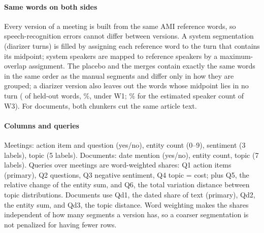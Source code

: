 \documentclass[conference]{IEEEtran}
\begin{document}
\paragraph*{Same words on both sides} Every version of a meeting is built from the same AMI reference words, so
speech-recognition errors cannot differ between versions. A system segmentation (diarizer turns) is filled by
assigning each reference word to the turn that contains its midpoint; system speakers are mapped to reference
speakers by a maximum-overlap assignment. The placebo and the merges contain exactly the same words in the same order
as the manual segments and differ only in how they are grouped; a diarizer version also leaves out the words whose
midpoint lies in no turn (\nDropWoneN{} of \nDropTotal{} held-out words, \nDropWone\%, under W1; \nDropWthree\% for the
estimated speaker count of W3). For documents, both
chunkers cut the same article text.
\paragraph*{Columns and queries} Meetings: action item and question (yes/no), entity count (0--9), sentiment (3
labels), topic (5 labels). Documents: date mention (yes/no), entity count, topic (7 labels). Queries over meetings
are word-weighted shares: Q1 action items (primary), Q2 questions, Q3 negative sentiment, Q4 topic = cost; plus Q5,
the relative change of the entity sum, and Q6, the total variation distance between topic distributions. Documents
use Qd1, the dated share of text (primary), Qd2, the entity sum, and Qd3, the topic distance. Word weighting makes the
shares independent of how many segments a version has, so a coarser segmentation is not penalized for having fewer
rows.
\end{document}
